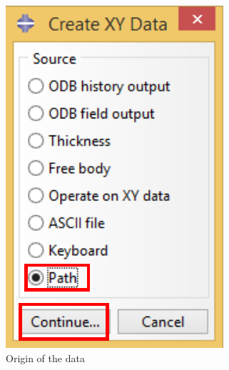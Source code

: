 \begin{enumerate}
\begin{figure}[H]
\begin{subfigure}{0.30\textwidth}
    \includegraphics[width=\textwidth]{./body/images/imagen105.pdf}
    \caption{Origin of the data}
    \label{figu105}
  \end{subfigure}%
  ~ %
  \begin{subfigure}{0.39\textwidth}

\end{subfigure}
\end{figure}
\end{enumerate}
